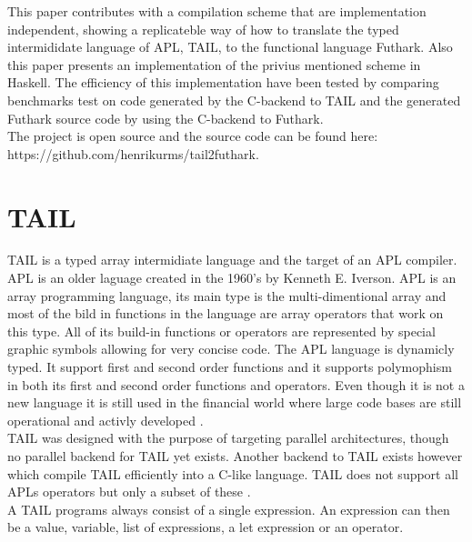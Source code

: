 \documentclass[11pt]{article}
\begin{document}
This paper contributes with a compilation scheme that are implementation independent, showing a replicateble 
way of how to translate the typed intermididate language of APL, TAIL, to the functional language Futhark. Also 
this paper presents an implementation of the privius mentioned scheme in Haskell. The efficiency of this
 implementation have been tested by comparing benchmarks test on code generated by the C-backend to TAIL 
 and the generated Futhark source code by using the C-backend to Futhark. \\

The project is open source and the source code can be found here:\\ https://github.com/henrikurms/tail2futhark.

\section{TAIL}

TAIL is a typed array intermidiate language and the target of an APL compiler. APL is an older laguage created in the 1960's by Kenneth E. Iverson. APL is an array programming language, its main type is the multi-dimentional array 
and most of the bild in functions in the language are array operators that work on this type. 
All of its build-in functions or operators are represented by special graphic symbols allowing for very concise code.
The APL language is dynamicly typed. It support first and second order functions and it supports polymophism in 
both its first and second order functions and operators. 
Even though it is not a new language it is still used in the financial world 
where large code bases are still operational and activly developed \cite{ElsmanDybdal:Array:2014}. \\


TAIL was designed with the purpose of targeting parallel architectures, though no parallel backend for TAIL yet exists.
Another backend to TAIL exists however which compile TAIL efficiently into a C-like language. TAIL does not support
 all APLs operators but only a subset of these \cite{ElsmanDybdal:Array:2014}.\\

A TAIL programs always consist of a single expression. An expression can then be a value, variable, 
list of expressions, a let expression or an operator. \\
\end{document}
